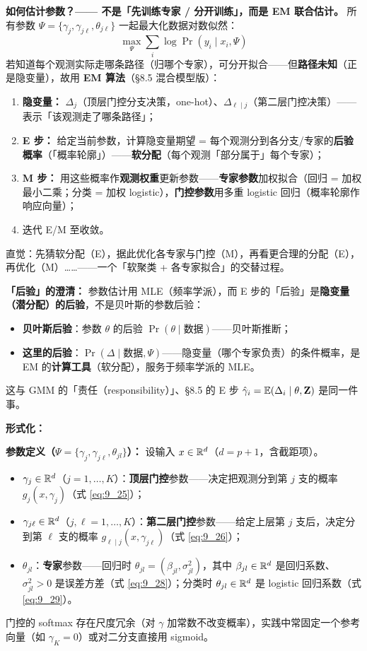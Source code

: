 \textbf{如何估计参数？—— 不是「先训练专家 / 分开训练」，而是 EM 联合估计。} 所有参数 $\Psi = \{\gamma_j, \gamma_{j\ell}, \theta_{j\ell}\}$ 一起最大化数据对数似然：
\[
    \max_{\Psi}\sum_{i}\log\Pr(y_i \mid x_i, \Psi)
\]
若知道每个观测实际走哪条路径（归哪个专家），可分开拟合——但\textbf{路径未知}（正是隐变量），故用 \textbf{EM 算法}（§8.5 混合模型版）：
\begin{enumerate}
    \item \textbf{隐变量：} $\Delta_j$（顶层门控分支决策，one-hot）、$\Delta_{\ell\mid j}$（第二层门控决策）——表示「该观测走了哪条路径」；
    \item \textbf{E 步：} 给定当前参数，计算隐变量期望 = 每个观测分到各分支/专家的\textbf{后验概率}（「概率轮廓」）——\textbf{软分配}（每个观测「部分属于」每个专家）；
    \item \textbf{M 步：} 用这些概率作\textbf{观测权重}更新参数——\textbf{专家参数}加权拟合（回归 = 加权最小二乘；分类 = 加权 logistic），\textbf{门控参数}用多重 logistic 回归（概率轮廓作响应向量）；
    \item 迭代 E/M 至收敛。
\end{enumerate}
直觉：先猜软分配（E），据此优化各专家与门控（M），再看更合理的分配（E），再优化（M）……——一个「软聚类 + 各专家拟合」的交替过程。

\textbf{「后验」的澄清：} 参数估计用 MLE（频率学派），而 E 步的「后验」是\textbf{隐变量（潜分配）的后验}，不是贝叶斯的参数后验：
\begin{itemize}
    \item \textbf{贝叶斯后验}：参数 $\theta$ 的后验 $\Pr(\theta \mid \text{数据})$——贝叶斯推断；
    \item \textbf{这里的后验}：$\Pr(\Delta \mid \text{数据}, \Psi)$——隐变量（哪个专家负责）的条件概率，是 EM 的\textbf{计算工具}（软分配），服务于频率学派的 MLE。
\end{itemize}
这与 GMM 的「责任（responsibility）」、§8.5 的 E 步 $\hat\gamma_i = \mathbb{E}(\Delta_i \mid \theta, \mathbf{Z})$ 是同一件事。

\textbf{形式化：}

\textbf{参数定义（$\Psi = \{\gamma_j, \gamma_{j\ell}, \theta_{jl}\}$）：} 设输入 $x \in \mathbb{R}^d$（$d = p+1$，含截距项）。
\begin{itemize}
    \item $\gamma_j \in \mathbb{R}^d$（$j = 1, \ldots, K$）：\textbf{顶层门控}参数——决定把观测分到第 $j$ 支的概率 $g_j(x,\gamma_j)$（式 \eqref{eq:9_25}）；
    \item $\gamma_{j\ell} \in \mathbb{R}^d$（$j, \ell = 1, \ldots, K$）：\textbf{第二层门控}参数——给定上层第 $j$ 支后，决定分到第 $\ell$ 支的概率 $g_{\ell \mid j}(x,\gamma_{j\ell})$（式 \eqref{eq:9_26}）；
    \item $\theta_{jl}$：\textbf{专家}参数——回归时 $\theta_{jl} = (\beta_{jl}, \sigma^2_{jl})$，其中 $\beta_{jl} \in \mathbb{R}^d$ 是回归系数、$\sigma^2_{jl} > 0$ 是误差方差（式 \eqref{eq:9_28}）；分类时 $\theta_{jl} \in \mathbb{R}^d$ 是 logistic 回归系数（式 \eqref{eq:9_29}）。
\end{itemize}
门控的 softmax 存在尺度冗余（对 $\gamma$ 加常数不改变概率），实践中常固定一个参考向量（如 $\gamma_K = 0$）或对二分支直接用 sigmoid。


